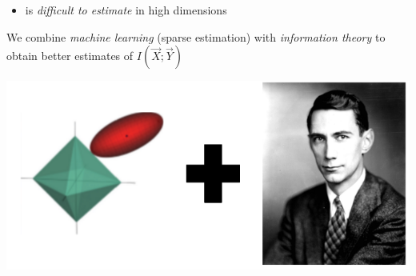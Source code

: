 \documentclass{beamer}
\begin{document}
\begin{frame}
\begin{columns}
\begin{column}{0.75\textwidth}
\begin{itemize}
\item is \emph{difficult to estimate} in high dimensions \pause
\end{itemize}
We combine \emph{machine learning} (sparse estimation) with \emph{information theory} to obtain better estimates of $I(\vec{X}; \vec{Y})$
\begin{center}
\includegraphics[scale = 0.23]{ml_shann.png}
\end{center}
\end{column}
\end{columns}
\end{frame}
\end{document}
